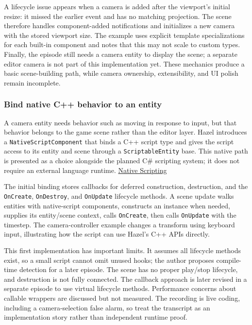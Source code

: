 A lifecycle issue appears when a camera is added after the viewport's initial resize: it missed the earlier event and has no matching projection. The scene therefore handles component-added notifications and initializes a new camera with the stored viewport size. The example uses explicit template specializations for each built-in component and notes that this may not scale to custom types. Finally, the episode still needs a camera entity to display the scene; a separate editor camera is not part of this implementation yet. These mechanics produce a basic scene-building path, while camera ownership, extensibility, and UI polish remain incomplete.

\subsubsection{Bind native C++ behavior to an entity}\label{bind-native-c-behavior-to-an-entity}

A camera entity needs behavior such as moving in response to input, but that behavior belongs to the game scene rather than the editor layer. Hazel introduces a \texttt{NativeScriptComponent} that binds a C++ script type and gives the script access to its entity and scene through a \texttt{ScriptableEntity} base. This native path is presented as a choice alongside the planned C\# scripting system; it does not require an external language runtime. \href{https://www.youtube.com/watch?v=iIUhg88MK5M}{Native Scripting}

The initial binding stores callbacks for deferred construction, destruction, and the \texttt{OnCreate}, \texttt{OnDestroy}, and \texttt{OnUpdate} lifecycle methods. A scene update walks entities with native-script components, constructs an instance when needed, supplies its entity/scene context, calls \texttt{OnCreate}, then calls \texttt{OnUpdate} with the timestep. The camera-controller example changes a transform using keyboard input, illustrating how the script can use Hazel's C++ APIs directly.

This first implementation has important limits. It assumes all lifecycle methods exist, so a small script cannot omit unused hooks; the author proposes compile-time detection for a later episode. The scene has no proper play/stop lifecycle, and destruction is not fully connected. The callback approach is later revised in a separate episode to use virtual lifecycle methods. Performance concerns about callable wrappers are discussed but not measured. The recording is live coding, including a camera-selection false alarm, so treat the transcript as an implementation story rather than independent runtime proof.

